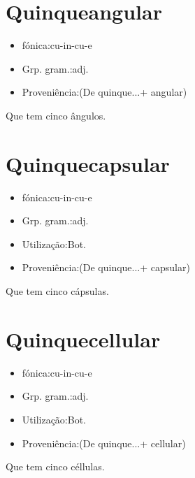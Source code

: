 \section{Quinqueangular}
\begin{itemize}
\item {fónica:cu-in-cu-e}
\end{itemize}
\begin{itemize}
\item {Grp. gram.:adj.}
\end{itemize}
\begin{itemize}
\item {Proveniência:(De \textunderscore quinque...\textunderscore  + \textunderscore angular\textunderscore )}
\end{itemize}
Que tem cinco ângulos.
\section{Quinquecapsular}
\begin{itemize}
\item {fónica:cu-in-cu-e}
\end{itemize}
\begin{itemize}
\item {Grp. gram.:adj.}
\end{itemize}
\begin{itemize}
\item {Utilização:Bot.}
\end{itemize}
\begin{itemize}
\item {Proveniência:(De \textunderscore quinque...\textunderscore  + \textunderscore capsular\textunderscore )}
\end{itemize}
Que tem cinco cápsulas.
\section{Quinquecellular}
\begin{itemize}
\item {fónica:cu-in-cu-e}
\end{itemize}
\begin{itemize}
\item {Grp. gram.:adj.}
\end{itemize}
\begin{itemize}
\item {Utilização:Bot.}
\end{itemize}
\begin{itemize}
\item {Proveniência:(De \textunderscore quinque...\textunderscore  + \textunderscore cellular\textunderscore )}
\end{itemize}
Que tem cinco céllulas.
